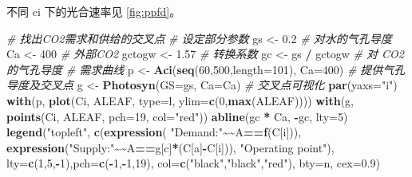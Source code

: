\documentclass[
]{krantz}
\makeatletter
\newenvironment{Shaded}{\begin{snugshade}}{\end{snugshade}}
\newcommand{\CommentTok}[1]{\textcolor[rgb]{0.56,0.35,0.01}{\textit{#1}}}
\newcommand{\DataTypeTok}[1]{\textcolor[rgb]{0.13,0.29,0.53}{#1}}
\newcommand{\DecValTok}[1]{\textcolor[rgb]{0.00,0.00,0.81}{#1}}
\newcommand{\ErrorTok}[1]{\textcolor[rgb]{0.64,0.00,0.00}{\textbf{#1}}}
\newcommand{\FloatTok}[1]{\textcolor[rgb]{0.00,0.00,0.81}{#1}}
\newcommand{\KeywordTok}[1]{\textcolor[rgb]{0.13,0.29,0.53}{\textbf{#1}}}
\newcommand{\NormalTok}[1]{#1}
\newcommand{\OperatorTok}[1]{\textcolor[rgb]{0.81,0.36,0.00}{\textbf{#1}}}
\newcommand{\StringTok}[1]{\textcolor[rgb]{0.31,0.60,0.02}{#1}}
\newenvironment{kframe}{%
\medskip{}
\setlength{\fboxsep}{.8em}
 \def\at@end@of@kframe{}%
 \ifinner\ifhmode%
  \def\at@end@of@kframe{\end{minipage}}%
  \begin{minipage}{\columnwidth}%
 \fi\fi%
 \def\FrameCommand##1{\hskip\@totalleftmargin \hskip-\fboxsep
 \colorbox{shadecolor}{##1}\hskip-\fboxsep
     \hskip-\linewidth \hskip-\@totalleftmargin \hskip\columnwidth}%
 \MakeFramed {\advance\hsize-\width
   \@totalleftmargin\z@ \linewidth\hsize
   \@setminipage}}%
 {\par\unskip\endMakeFramed%
 \at@end@of@kframe}
\renewenvironment{Shaded}{\begin{kframe}}{\end{kframe}}
\makeatother
\begin{document}
不同 ci 下的光合速率见 \ref{fig:ppfd}。

\begin{Shaded}
\begin{Highlighting}[]
\CommentTok{\# 找出CO2需求和供给的交叉点}
\CommentTok{\# 设定部分参数}
\NormalTok{gs \textless{}{-}}\StringTok{ }\FloatTok{0.2} \CommentTok{\# 对水的气孔导度}
\NormalTok{Ca \textless{}{-}}\StringTok{ }\DecValTok{400} \CommentTok{\# 外部CO2}
\NormalTok{gctogw \textless{}{-}}\StringTok{ }\FloatTok{1.57} \CommentTok{\# 转换系数}
\NormalTok{gc \textless{}{-}}\StringTok{ }\NormalTok{gs }\OperatorTok{/}\StringTok{ }\NormalTok{gctogw }\CommentTok{\# 对 CO2 的气孔导度}
\CommentTok{\# 需求曲线}
\NormalTok{p \textless{}{-}}\StringTok{ }\KeywordTok{Aci}\NormalTok{(}\KeywordTok{seq}\NormalTok{(}\DecValTok{60}\NormalTok{,}\DecValTok{500}\NormalTok{,}\DataTypeTok{length=}\DecValTok{101}\NormalTok{), }\DataTypeTok{Ca=}\DecValTok{400}\NormalTok{)}
\CommentTok{\# 提供气孔导度及交叉点}
\NormalTok{g \textless{}{-}}\StringTok{ }\KeywordTok{Photosyn}\NormalTok{(}\DataTypeTok{GS=}\NormalTok{gs, }\DataTypeTok{Ca=}\NormalTok{Ca)}
\CommentTok{\# 交叉点可视化}
\KeywordTok{par}\NormalTok{(}\DataTypeTok{yaxs=}\StringTok{"i"}\NormalTok{)}
\KeywordTok{with}\NormalTok{(p, }\KeywordTok{plot}\NormalTok{(Ci, ALEAF, }\DataTypeTok{type=}\StringTok{\textquotesingle{}l\textquotesingle{}}\NormalTok{, }
             \DataTypeTok{ylim=}\KeywordTok{c}\NormalTok{(}\DecValTok{0}\NormalTok{,}\KeywordTok{max}\NormalTok{(ALEAF))))}
\KeywordTok{with}\NormalTok{(g, }\KeywordTok{points}\NormalTok{(Ci, ALEAF, }\DataTypeTok{pch=}\DecValTok{19}\NormalTok{, }\DataTypeTok{col=}\StringTok{"red"}\NormalTok{))}
\KeywordTok{abline}\NormalTok{(gc }\OperatorTok{*}\StringTok{ }\NormalTok{Ca, }\OperatorTok{{-}}\NormalTok{gc, }\DataTypeTok{lty=}\DecValTok{5}\NormalTok{)}
\KeywordTok{legend}\NormalTok{(}\StringTok{"topleft"}\NormalTok{, }\KeywordTok{c}\NormalTok{(}\KeywordTok{expression}\NormalTok{(}
  \StringTok{"Demand:"}\OperatorTok{\textasciitilde{}}\ErrorTok{\textasciitilde{}}\NormalTok{A}\OperatorTok{==}\KeywordTok{f}\NormalTok{(C[i])),}
   \KeywordTok{expression}\NormalTok{(}\StringTok{"Supply:"}\OperatorTok{\textasciitilde{}}\ErrorTok{\textasciitilde{}}\NormalTok{A}\OperatorTok{==}\NormalTok{g[c]}\OperatorTok{*}\NormalTok{(C[a]}\OperatorTok{{-}}\NormalTok{C[i])),}
              \StringTok{"Operating point"}\NormalTok{),}
   \DataTypeTok{lty=}\KeywordTok{c}\NormalTok{(}\DecValTok{1}\NormalTok{,}\DecValTok{5}\NormalTok{,}\OperatorTok{{-}}\DecValTok{1}\NormalTok{),}\DataTypeTok{pch=}\KeywordTok{c}\NormalTok{(}\OperatorTok{{-}}\DecValTok{1}\NormalTok{,}\OperatorTok{{-}}\DecValTok{1}\NormalTok{,}\DecValTok{19}\NormalTok{),}
   \DataTypeTok{col=}\KeywordTok{c}\NormalTok{(}\StringTok{"black"}\NormalTok{,}\StringTok{"black"}\NormalTok{,}\StringTok{"red"}\NormalTok{),}
   \DataTypeTok{bty=}\StringTok{\textquotesingle{}n\textquotesingle{}}\NormalTok{, }\DataTypeTok{cex=}\FloatTok{0.9}\NormalTok{)}
\end{Highlighting}
\end{Shaded}
\end{document}
